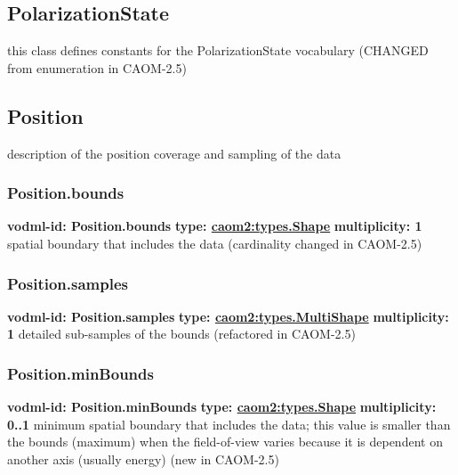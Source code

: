   \subsection{PolarizationState}
  \label{sect:PolarizationState}
    this class defines constants for the PolarizationState vocabulary (CHANGED from enumeration in CAOM-2.5)

  \subsection{Position}
  \label{sect:Position}
    description of the position coverage and sampling of the data

    \subsubsection{Position.bounds}
      \textbf{vodml-id: Position.bounds} \newline
      \textbf{type: \hyperref[sect:types.Shape]{caom2:types.Shape}} \newline
      \textbf{multiplicity: 1} \newline
      spatial boundary that includes the data (cardinality changed in CAOM-2.5)

    \subsubsection{Position.samples}
      \textbf{vodml-id: Position.samples} \newline
      \textbf{type: \hyperref[sect:types.MultiShape]{caom2:types.MultiShape}} \newline
      \textbf{multiplicity: 1} \newline
      detailed sub-samples of the bounds (refactored in CAOM-2.5)

    \subsubsection{Position.minBounds}
      \textbf{vodml-id: Position.minBounds} \newline
      \textbf{type: \hyperref[sect:types.Shape]{caom2:types.Shape}} \newline
      \textbf{multiplicity: 0..1} \newline
      minimum spatial boundary that includes the data; this value is smaller than the bounds (maximum) when the field-of-view varies because it is dependent on another axis (usually energy) (new in CAOM-2.5)

